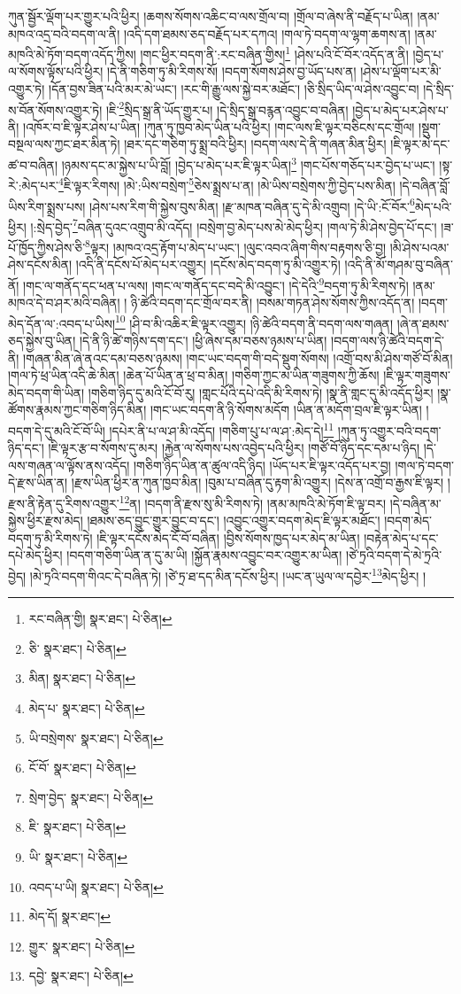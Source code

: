 ཀུན་སྦྱོར་ལྡོག་པར་གྱུར་པའི་ཕྱིར། །ཆགས་སོགས་འཆིང་བ་ལས་གྲོལ་བ། །གྲོལ་བ་ཞེས་ནི་བརྗོད་པ་ཡིན། །ནམ་མཁའ་འདྲ་བའི་བདག་ལ་ནི། །འདི་དག་ཐམས་ཅད་བརྗོད་པར་དཀའ། །གལ་ཏེ་བདག་ལ་ལྷག་ཆགས་ན། །ནམ་མཁའི་མེ་ཏོག་བདག་འདོད་ཀྱིས། །གང་ཕྱིར་བདག་ནི་:རང་བཞིན་གྱིས།\footnote{རང་བཞིན་གྱི།  སྣར་ཐང་།  པེ་ཅིན། } །ཤེས་པའི་ངོ་བོར་འདོད་ན་ནི། །བྱེད་པ་ལ་སོགས་ལྟོས་པའི་ཕྱིར། །དེ་ནི་གཅིག་ཏུ་མི་རིགས་སོ། །བདག་སོགས་ཤེས་བྱ་ཡོད་པས་ན། །ཤེས་པ་ལྡོག་པར་མི་འགྱུར་ཏེ། །དོན་བྱས་ཟིན་པའི་མར་མེ་ཡང་། །རང་གི་རྒྱུ་ལས་སྐྱེ་བར་མཐོང་། །ཅི་སྲིད་ཡིད་ལ་ཤེས་འབྱུང་བ། །དེ་སྲིད་ས་བོན་སོགས་འགྱུར་ཏེ། །ཇི་\footnote{ཅི་  སྣར་ཐང་།  པེ་ཅིན། }སྲིད་སྒྲ་ནི་ཡོད་གྱུར་པ། །དེ་སྲིད་སྒྲ་བརྙན་འབྱུང་བ་བཞིན། །བྱེད་པ་མེད་པར་ཤེས་པ་ནི། །འཁོར་བ་ཇི་ལྟར་ཤེས་པ་ཡིན། །ཀུན་ཏུ་ཁྱབ་མེད་ཡིན་པའི་ཕྱིར། །གང་ལས་ཇི་ལྟར་བཅིངས་དང་གྲོལ། །སྡུག་བསྔལ་ལས་ཀྱང་ཐར་མིན་ཏེ། །ཐར་དང་གཅིག་ཏུ་སྨྲ་བའི་ཕྱིར། །བདག་ལས་དེ་ནི་གཞན་མིན་ཕྱིར། །ཇི་ལྟར་མེ་དང་ཚ་བ་བཞིན། །ཉམས་དང་མ་སྐྱེས་པ་ཡི་བློ། །བྱེད་པ་མེད་པར་ཇི་ལྟར་ཡིན།\footnote{མིན།  སྣར་ཐང་།  པེ་ཅིན། } །གང་པོས་གཅོད་པར་བྱེད་པ་ཡང་། །སྟ་རེ་:མེད་པར་\footnote{མེད་པ་  སྣར་ཐང་།  པེ་ཅིན། }ཇི་ལྟར་རིགས། །མེ་:ཡིས་བསྲེག་\footnote{ཡི་བསྲེགས་  སྣར་ཐང་།  པེ་ཅིན། }ཅེས་སྨྲས་པ་ན། །མེ་ཡིས་བསྲེགས་ཀྱི་བྱེད་པས་མིན། །དེ་བཞིན་བློ་ཡིས་རིག་སྨྲས་པས། །ཤེས་པས་རིག་གི་སྐྱེས་བུས་མིན། །རྫ་མཁན་བཞིན་དུ་དེ་མི་འགྲུབ། །དེ་ཡི་:ངོ་བོར་\footnote{ངོ་བོ་  སྣར་ཐང་།  པེ་ཅིན། }མེད་པའི་ཕྱིར། །:སྲེད་བྱེད་\footnote{སྲེག་བྱེད་  སྣར་ཐང་།  པེ་ཅིན། }བཞིན་དུའང་འགྲུབ་མི་འདོད། །བསྲེག་བྱ་མེད་པས་མེ་མེད་ཕྱིར། །གལ་ཏེ་མི་ཤེས་བྱེད་པོ་དང་། །ཟ་པོ་ཁྱོད་ཀྱིས་ཤེས་ཅི་\footnote{ཇི་  སྣར་ཐང་།  པེ་ཅིན། }ལྟར། །མཁའ་འདྲ་རྟོག་པ་མེད་པ་ཡང་། །ལུང་འབའ་ཞིག་གིས་བརྟགས་ཅི་བྱ། །མི་ཤེས་པའམ་ཤེས་དངོས་མིན། །འདི་ནི་དངོས་པོ་མེད་པར་འགྱུར། །དངོས་མེད་བདག་ཏུ་མི་འགྱུར་ཏེ། །འདི་ནི་མོ་གཤམ་བུ་བཞིན་ནོ། །གང་ལ་གནོད་དང་ཕན་པ་ལས། །གང་ལ་གནོད་དང་བདེ་མི་འབྱུང་། །དེ་དེའི་\footnote{ཡི་  སྣར་ཐང་།  པེ་ཅིན། }བདག་ཏུ་མི་རིགས་ཏེ། །ནམ་མཁའ་དེ་བ་ཤར་མའི་བཞིན། །
ཉི་ཚེའི་བདག་དང་གྲོལ་བར་ནི། །བསམ་གཏན་ཤེས་སོགས་ཀྱིས་འདོད་ན། །བདག་མེད་དོན་ལ་:འབད་པ་ཡིས།\footnote{འབད་པ་ཡི།  སྣར་ཐང་།  པེ་ཅིན། } །ཤི་བ་མི་འཆིར་ཇི་ལྟར་འགྱུར། །ཉི་ཚེའི་བདག་ནི་བདག་ལས་གཞན། །ཞེ་ན་ཐམས་ཅད་སྐྱེས་བུ་ཡིན། །དེ་ནི་ཉི་ཚེ་གཉིས་དག་དང་། །ཕྱི་ཞེས་དམ་བཅས་ཉམས་པ་ཡིན། །བདག་ལས་ཉི་ཚེའི་བདག་དེ་ནི། །གཞན་མིན་ཞེ་ནའང་དམ་བཅས་ཉམས། །གང་ཡང་བདག་གི་བདེ་སྡུག་སོགས། །འགྲོ་བས་མི་ཤེས་གཙོ་བོ་མིན། །གལ་ཏེ་ཕྲ་ཡིན་འདི་ཆེ་མིན། །ཆེན་པོ་ཡིན་ན་ཕྲ་བ་མིན། །གཅིག་ཀྱང་མ་ཡིན་གཟུགས་ཀྱི་ཆོས། །ཇི་ལྟར་གཟུགས་མེད་བདག་གི་ཡིན། །གཅིག་ཉིད་དུ་མའི་ངོ་བོ་རུ། །གླང་པོའི་དཔེ་འདི་མི་རིགས་ཏེ། །སྣ་ནི་གླང་དུ་མི་འདོད་ཕྱིར། །སྣ་ཚོགས་རྣམས་ཀྱང་གཅིག་ཉིད་མིན། །གང་ཡང་བདག་ནི་ཉི་སོགས་མདོག །ཡིན་ན་མདོག་བྲལ་ཇི་ལྟར་ཡིན། །བདག་དེ་དུ་མའི་ངོ་བོ་ཡི། །དཔེར་ནི་པ་ལ་ཤ་མི་འདོད། །གཅིག་པུ་པ་ལ་ཤ་:མེད་དེ།\footnote{མེད་དོ།  སྣར་ཐང་། } །ཀུན་ཏུ་འགྱུར་བའི་བདག་ཉིད་དང་། །ཇི་ལྟར་རྩ་བ་སོགས་དུ་མར། །རྐྱེན་ལ་སོགས་པས་འབྱེད་པའི་ཕྱིར། །གཙོ་བོ་ཉིད་དང་དམ་པ་ཉིད། །དེ་ལས་གཞན་ལ་ལྟོས་ནས་འདོད། །གཅིག་ཉིད་ཡིན་ན་ཚུལ་འདི་ཉིད། །ཡོད་པར་ཇི་ལྟར་འདོད་པར་བྱ། །གལ་ཏེ་བདག་དེ་རྫས་ཡིན་ན། །རྫས་ཡིན་ཕྱིར་ན་ཀུན་ཁྱབ་མིན། །བུམ་པ་བཞིན་དུ་རྟག་མི་འགྱུར། །དེས་ན་འགྲོ་བ་རྒྱས་ཇི་ལྟར། །རྫས་ནི་རྟེན་དུ་རིགས་འགྱུར་\footnote{གྱུར་  སྣར་ཐང་།  པེ་ཅིན། }ན། །བདག་ནི་རྫས་སུ་མི་རིགས་ཏེ། །ནམ་མཁའི་མེ་ཏོག་ཇི་ལྟ་བར། །དེ་བཞིན་མ་སྐྱེས་ཕྱིར་རྫས་མེད། །ཐམས་ཅད་བྱུང་གྱུར་བྱུང་བ་དང་། །འབྱུང་འགྱུར་བདག་མེད་ཇི་ལྟར་མཐོང་། །བདག་མེད་བདག་ཏུ་མི་རིགས་ཏེ། །ཇི་ལྟར་དངོས་མེད་ངོ་བོ་བཞིན། །བྱིས་སོགས་ཁྱད་པར་མེད་མ་ཡིན། །བརྟེན་མེད་པ་དང་དཔེ་མེད་ཕྱིར། །བདག་གཅིག་ཡིན་ན་དུ་མ་ཡི། །སྐྱོན་རྣམས་འབྱུང་བར་འགྱུར་མ་ཡིན། །ཙེ་ཏྲའི་བདག་དེ་མེ་ཏྲའི་བྱེད། །མེ་ཏྲའི་བདག་གིའང་དེ་བཞིན་ཏེ། །ཙེ་ཏྲ་ཐ་དད་མིན་དངོས་ཕྱིར། །ཡང་ན་ཡུལ་ལ་དབྱེར་\footnote{དབྱེ་  སྣར་ཐང་།  པེ་ཅིན། }མེད་ཕྱིར། །
